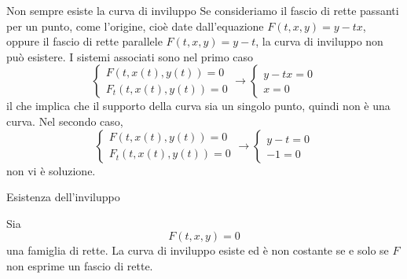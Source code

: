 \documentclass[a4paper]{article}
\begin{document}
\begin{radioactive}
\begin{snippetexample}{}{Non sempre esiste la curva di inviluppo}
    Se consideriamo il fascio di rette passanti per un punto, come l'origine, cioè date
    dall'equazione \(F(t,x,y) = y - tx\), oppure il fascio di rette parallele
    \(F(t,x,y) = y- t\), la curva di inviluppo non può esistere.
    I sistemi associati sono nel primo caso
    \[
        \begin{cases}
            F(t,x(t), y(t)) = 0 \\
            F_t(t, x(t), y(t)) = 0
        \end{cases}
        \rightarrow
        \begin{cases}
            y - tx = 0 \\
            x = 0
        \end{cases}
    \]
    il che implica che il supporto della curva sia un singolo punto, quindi non è una curva.
    Nel secondo caso,
    \[
        \begin{cases}
            F(t,x(t), y(t)) = 0 \\
            F_t(t, x(t), y(t)) = 0
        \end{cases}
        \rightarrow
        \begin{cases}
            y - t = 0 \\
            -1 = 0
        \end{cases}
    \]
    non vi è soluzione.
\end{snippetexample}
\end{radioactive}


\begin{radioactive}
\begin{snippetproposition}{Esistenza dell'inviluppo}
    \begin{figure}
        \vspace{-1cm}
    \end{figure}
    Sia
    \[
        F(t,x,y)=0
    \]
    una famiglia di rette. La curva di inviluppo esiste ed è non costante
    se e solo se \(F\) non esprime un fascio di rette. \wrapfill
\end{snippetproposition}
\end{radioactive}
\end{document}
